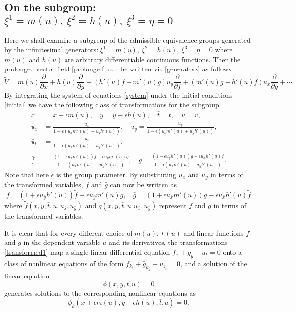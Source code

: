 \documentclass[a4paper]{article}
\def\be{\begin{equation}}
\def\ee{\end{equation}}
\begin{document}
  \subsection{On the subgroup: $\xi^1=m(u),\ \xi^2=h(u), \ \xi^3=\eta=0$  }
Here we shall examine a subgroup of the admissible equivalence groups generated by the infinitesimal generators: $\xi^1=m(u),\ \xi^2=h(u), \ \xi^3=\eta=0$  where $m(u)$ and $h(u)$ are arbitrary differentiable continuous functions.
 Then the prolonged vector field \eqref{prolonged} can be written via \eqref{generators} as follows
 \be
 \tilde{V}=m(u)\frac{\partial}{\partial x}+h(u)\frac{\partial}{\partial y}+(h'(u)f-m'(u)g)u_y\frac{\partial}{\partial f}+(m'(u)g-h'(u)f)u_x\frac{\partial}{\partial g}+\cdots
 \ee
 By integrating the system of equations \eqref{system} under the initial conditions \eqref{initial} we have the following class of transformations for the subgroup
 \be
 \label{case1}
 \begin{split}
 \bar x&=x-\epsilon m(u),\quad \bar y=y-\epsilon h(u),\quad \bar t=t,\quad \bar u=u,\\
 \bar u_x&=\frac{u_x}{1-\epsilon(u_x m'(u)+u_yh'(u))},\quad \bar u_y=\frac{u_y}{1-\epsilon(u_xm'(u)+u_yh'(u))},\\
  \bar u_t&=
\frac{u_t}{1-\epsilon(u_xm'(u)+u_yh'(u))},\\
 \bar f&=\frac{(1- \epsilon u_x  m'(u))f-\epsilon u_y  m'(u)g}{1-\epsilon(u_xm'(u)+u_yh'(u))},\quad
 \bar g=\frac{(1-\epsilon u_y h'(u))g-\epsilon u_xh'(u)f}{1-\epsilon(u_xm'(u)+u_yh'(u))}.
 \end{split}
 \ee
Note that here $\epsilon$  is the group parameter.  By substituting $u_x$ and $ u_y$ in terms of the transformed variables,
 $\bar f$ and $\bar g$   can now be written as
\be
\label{transformed1}
 \bar f=\left(1+\epsilon \bar u_{\bar y} h'(\bar u)\right)\tilde f-\epsilon \bar u_{\bar y}m'(\bar u)\tilde g,\quad
  \bar g= \left(1+\epsilon \bar u_{\bar x} m'(\bar u)\right)\tilde g-\epsilon \bar u_{\bar x}h'(\bar u)\tilde f
 \ee
 where $\tilde f(\bar x,\bar y,\bar t,\bar u,\bar u_{\bar x},\bar
u_{\bar y})$ and $\tilde g(\bar x,\bar y,\bar t,\bar u,\bar u_{\bar
x},\bar u_{\bar y})$  represent $f$ and $g$ in terms of the
transformed variables.\\
\par 
It is clear that for every different choice of $m(u),\ h(u)$ and linear functions $f$ and
 $g$ in the dependent variable $u$ and its derivatives, the transformations \eqref{transformed1}  map a single linear differential equation $f_x+g_y-u_t=0$  onto a class of  nonlinear equations of the form 
  $ \bar f_{k_{ \bar x}}+\bar g_{k_{ \bar y}}-\bar u_{k_{ \bar t}}=0$, and  a solution of the linear equation $$\phi(x,y,t,u)=0$$ generates  solutions to the corresponding nonlinear
 equations as
 $$\phi_k(\bar x+\epsilon m(\bar u),\bar y+\epsilon h(\bar u),\bar t,\bar u)=0.$$
\end{document}
